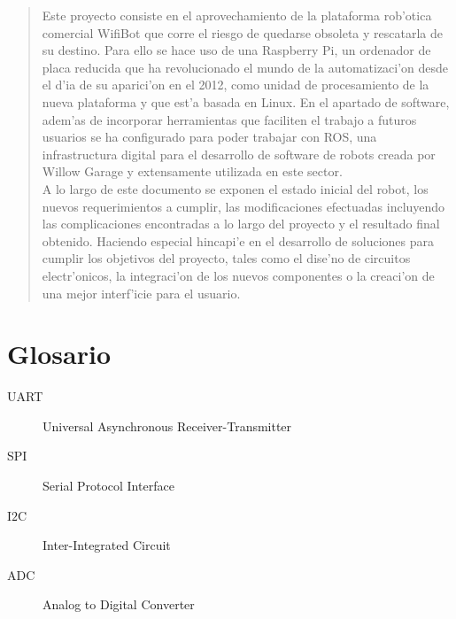 \documentclass[twoside,12pt]{article}
\begin{document}
\normalsize
\begin{abstract}
Este proyecto consiste en el aprovechamiento de la plataforma rob'otica comercial WifiBot que corre el riesgo de quedarse obsoleta y rescatarla de su destino. Para ello se hace uso de una Raspberry Pi, un ordenador de placa reducida que ha revolucionado el mundo de la automatizaci'on desde el d'ia de su aparici'on en el 2012, como unidad de procesamiento de la nueva plataforma y que est'a basada en Linux. En el apartado de software, adem'as de incorporar herramientas que faciliten el trabajo a futuros usuarios se ha configurado para poder trabajar con ROS, una infrastructura digital para el desarrollo de software de robots creada por Willow Garage y extensamente utilizada en este sector.\\

A lo largo de este documento se exponen el estado inicial del robot, los nuevos requerimientos a cumplir, las modificaciones efectuadas incluyendo las complicaciones encontradas a lo largo del proyecto y el resultado final obtenido. Haciendo especial hincapi'e en el desarrollo de soluciones para cumplir los objetivos del proyecto, tales como el dise'no de circuitos electr'onicos, la integraci'on de los nuevos componentes o la creaci'on de una mejor interf'icie para el usuario. \\

\end{abstract}

\newpage

\paragraph*{}
\thispagestyle{empty}
\newpage

\tableofcontents
\setcounter{page}{1}
\newpage

\setcounter{page}{5}
\fancyhead[LE,RO]{\thepage}

\section*{Glosario}
\begin{description}
\item[UART] Universal Asynchronous Receiver-Transmitter
\item[SPI] Serial Protocol Interface
\item[I${2}$C] Inter-Integrated Circuit
\item[ADC] Analog to Digital Converter
\end{description}
\end{document}
